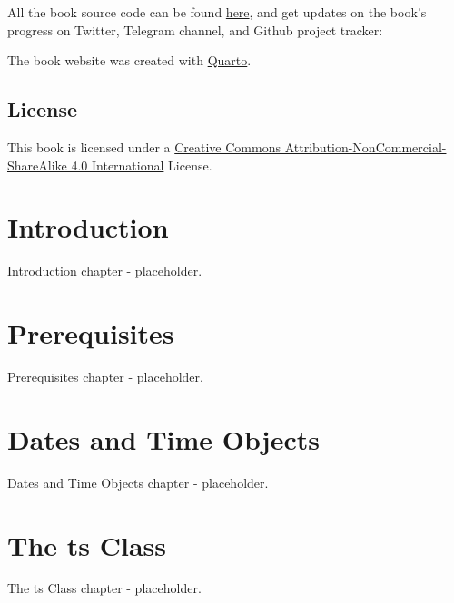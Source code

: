 \documentclass[
  letterpaper,
  DIV=11,
  numbers=noendperiod]{scrreprt}
\begin{document}
All the book source code can be found
\href{https://github.com/RamiKrispin/atsaf}{here}, and get updates on
the book's progress on Twitter, Telegram channel, and Github project
tracker:

The book website was created with \href{https://quarto.org/}{Quarto}.

\hypertarget{license}{%
\section*{License}\label{license}}

This book is licensed under a
\href{https://creativecommons.org/licenses/by-nc-sa/4.0/}{Creative
Commons Attribution-NonCommercial-ShareAlike 4.0 International} License.


\hypertarget{introduction}{%
\chapter{Introduction}\label{introduction}}

Introduction chapter - placeholder.


\hypertarget{prerequisites}{%
\chapter{Prerequisites}\label{prerequisites}}

Prerequisites chapter - placeholder.


\hypertarget{dates-and-time-objects}{%
\chapter{Dates and Time Objects}\label{dates-and-time-objects}}

Dates and Time Objects chapter - placeholder.


\hypertarget{the-ts-class}{%
\chapter{The ts Class}\label{the-ts-class}}

The ts Class chapter - placeholder.

\end{document}

